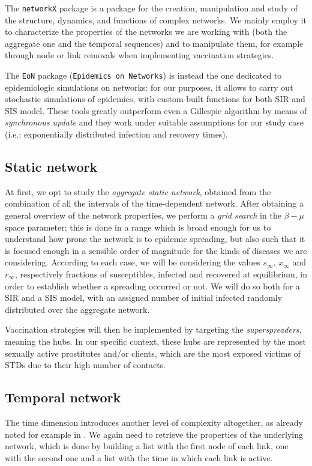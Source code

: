 \documentclass[a4paper,11pt, twocolumn]{article}
\begin{document}
The \texttt{networkX} package \cite{networkx} is a package for the creation, manipulation and study of the structure, dynamics, and functions of complex networks. We mainly employ it to characterize the properties of the networks we are working with (both the aggregate one and the temporal sequences) and to manipulate them, for example through node or link removals when implementing vaccination strategies.

The \texttt{EoN} package (\texttt{Epidemics on Networks}) \cite{simulations} is instead the one dedicated to epidemiologic simulations on networks: for our purposes, it allows to carry out stochastic simulations of epidemics, with custom-built functions for both SIR and SIS model. These tools greatly outperform even a Gillespie algorithm by means of \emph{synchronous update} and they work under suitable assumptions for our study case (i.e.: exponentially distributed infection and recovery times).


\subsection{Static network}
At first, we opt to study the \emph{aggregate static network}, obtained from the combination of all the intervals of the time-dependent network. After obtaining a general overview of the network properties, we perform a \emph{grid search} in the $\beta - \mu$ space parameter; this is done in a range which is broad enough for us to understand how prone the network is to epidemic spreading, but also such that it is focused enough in a sensible order of magnitude for the kinds of diseases we are considering. According to each case, we will be considering the values $s_{\infty}$, $x_{\infty}$ and $r_{\infty}$, respectively fractions of susceptibles, infected and recovered at equilibrium, in order to establish whether a spreading occurred or not. We will do so both for a SIR and a SIS model, with an assigned number of initial infected randomly distributed over the aggregate network.

Vaccination strategies will then be implemented by targeting the \emph{superspreaders}, meaning the hubs. In our specific context, these hubs are represented by the most sexually active prostitutes and/or clients, which are the most exposed victims of STDs due to their high number of contacts. 


\subsection{Temporal network}
The time dimension introduces another level of complexity altogether, as already noted for example in \cite{sir_net}. We again need to retrieve the properties of the underlying network, which is done by building a list with the first node of each link, one with the second one and a list with the time in which each link is active. 
\end{document}
